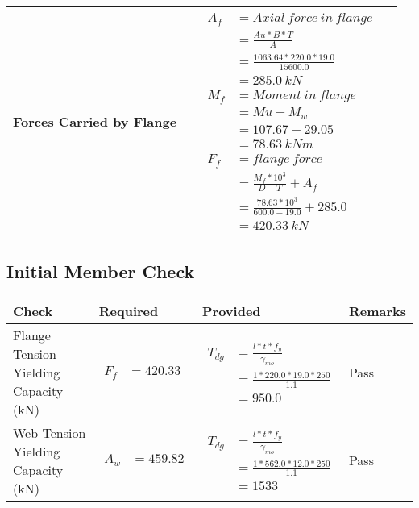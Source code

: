 \documentclass{article}%
\begin{document}
\begin{longtable}{|p{4cm}|p{3.5cm}|p{6.5cm}|p{1.5cm}|}
\hline%
Forces Carried by Flange&&$\begin{aligned} A_f&= Axial~force~ in ~flange  \\ &= \frac{Au * B *T}{A} \\ &= \frac{1063.64 * 220.0*19.0}{15600.0} \\ &=285.0~ kN\\ M_f& =Moment~ in~ flange \\  & = Mu-M_w\\ &= 107.67-29.05\\ &=78.63~{kNm}\\  F_f& =flange~force  \\ & = \frac{M_f *10^3}{D-T} + A_f \\ &= \frac{78.63* 10^3}{600.0-19.0} +285.0 \\ &=420.33~kN \end{aligned}$&\\%
\hline%
\end{longtable}

%
\newpage%
\subsection{Initial Member Check}%
\label{subsec:InitialMemberCheck}%
\renewcommand{\arraystretch}{1.2}%
\begin{longtable}{|p{3cm}|p{4.5cm}|p{6.5cm}|p{1.5cm}|}%
\hline%
\rowcolor{OsdagGreen}%
Check&Required&Provided&Remarks\\%
\hline%
\endhead%
\hline%
Flange Tension Yielding Capacity (kN)&$\begin{aligned} F_f &=420.33\end{aligned}$&$\begin{aligned} T_{dg} &= \frac{l*t*f_y}{\gamma_{mo}}\\ &=\frac{1*220.0*19.0*250}{1.1}\\ &=950.0\end{aligned}$&Pass\\%
\hline%
Web Tension Yielding Capacity (kN)&$\begin{aligned} A_w &=459.82\end{aligned}$&$\begin{aligned} T_{dg} &= \frac{l*t*f_y}{\gamma_{mo}}\\ &=\frac{1*562.0*12.0*250}{1.1}\\ &=1533\end{aligned}$&Pass\\%
\hline%
\end{longtable}
\end{document}

